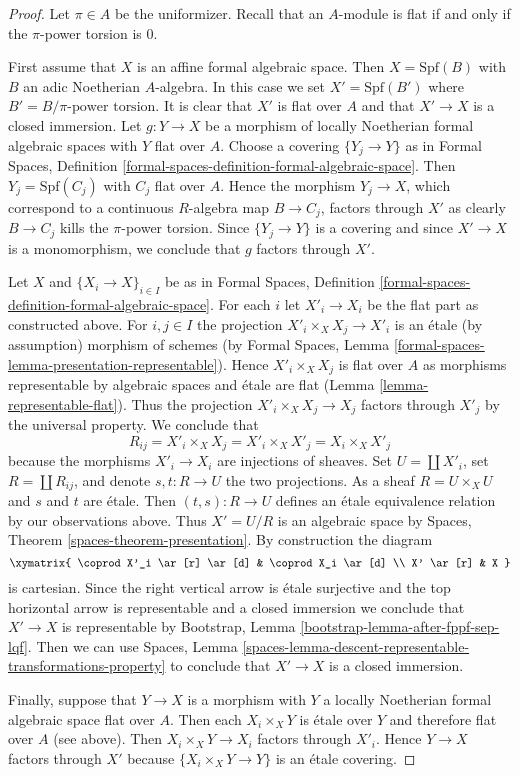 \begin{proof}
Let $\pi \in A$ be the uniformizer. Recall that an $A$-module
is flat if and only if the $\pi$-power torsion is $0$.

\medskip\noindent
First assume that $X$ is an affine formal algebraic space.
Then $X = \text{Spf}(B)$ with $B$ an adic Noetherian $A$-algebra.
In this case we set $X' = \text{Spf}(B')$ where
$B' = B/\pi\text{-power torsion}$. It is clear that $X'$ is flat
over $A$ and that $X' \to X$ is a closed immersion.
Let $g : Y \to X$ be a morphism of locally Noetherian formal algebraic spaces
with $Y$ flat over $A$. Choose a covering $\{Y_j \to Y\}$ as in
Formal Spaces, Definition
\ref{formal-spaces-definition-formal-algebraic-space}.
Then $Y_j = \text{Spf}(C_j)$ with $C_j$ flat over $A$.
Hence the morphism $Y_j \to X$, which correspond to a continuous
$R$-algebra map $B \to C_j$, factors through $X'$ as clearly
$B \to C_j$ kills the $\pi$-power torsion.
Since $\{Y_j \to Y\}$ is a covering and since $X' \to X$
is a monomorphism, we conclude that $g$ factors through $X'$.

\medskip\noindent
Let $X$ and $\{X_i \to X\}_{i \in I}$ be as in
Formal Spaces, Definition
\ref{formal-spaces-definition-formal-algebraic-space}.
For each $i$ let $X'_i \to X_i$ be the flat part as
constructed above. For $i, j \in I$ the projection
$X'_i \times_X X_j \to X'_i$ is an \'etale (by assumption)
morphism of schemes (by Formal Spaces, Lemma
\ref{formal-spaces-lemma-presentation-representable}).
Hence $X'_i \times_X X_j$ is flat over $A$ as morphisms
representable by algebraic spaces and \'etale
are flat (Lemma \ref{lemma-representable-flat}).
Thus the projection $X'_i \times_X X_j \to X_j$ factors
through $X'_j$ by the universal property. We conclude that
$$
R_{ij} = X'_i \times_X X_j = X'_i \times_X X'_j = X_i \times_X X'_j
$$
because the morphisms $X'_i \to X_i$ are injections of sheaves.
Set $U = \coprod X'_i$, set
$R = \coprod R_{ij}$, and denote $s, t : R \to U$ the two
projections. As a sheaf $R = U \times_X U$ and $s$ and $t$
are \'etale. Then $(t, s) : R \to U$ defines an \'etale equivalence
relation by our observations above. Thus $X' = U/R$ is an
algebraic space by Spaces, Theorem \ref{spaces-theorem-presentation}.
By construction the diagram
$$
\xymatrix{
\coprod X'_i \ar[r] \ar[d] & \coprod X_i \ar[d] \\
X' \ar[r] & X
}
$$
is cartesian. Since the right vertical arrow is \'etale surjective
and the top horizontal arrow is representable and a closed immersion
we conclude that $X' \to X$ is representable by
Bootstrap, Lemma \ref{bootstrap-lemma-after-fppf-sep-lqf}.
Then we can use Spaces, Lemma
\ref{spaces-lemma-descent-representable-transformations-property}
to conclude that $X' \to X$ is a closed immersion.

\medskip\noindent
Finally, suppose that $Y \to X$ is a morphism with
$Y$ a locally Noetherian formal algebraic space flat over $A$.
Then each $X_i \times_X Y$ is \'etale over $Y$ and
therefore flat over $A$ (see above).
Then $X_i \times_X Y \to X_i$ factors through $X'_i$.
Hence $Y \to X$ factors through $X'$ because
$\{X_i \times_X Y \to Y\}$ is an \'etale covering.
\end{proof}

